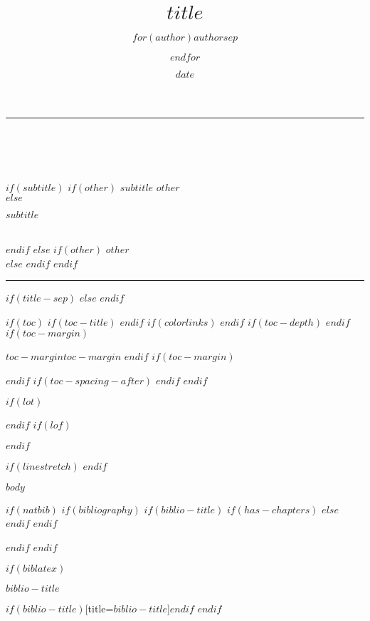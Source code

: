 \documentclass[
  $if(fontsize)$
    $fontsize$,
  $endif$
  $if(lang)$
    $babel-lang$,
  $endif$
  $if(papersize)$
    $papersize$paper,
  $endif$
  $if(beamer)$
    ignorenonframetext,
  $if(handout)$
    handout,
  $endif$
  $if(aspectratio)$
    aspectratio=$aspectratio$,
  $endif$
  $endif$
  $for(classoption)$
    $classoption$$sep$,
  $endfor$
]{$if(documentclass)$$documentclass$$else$article$endif$}
\title{$title$}
\author{$for(author)$$author$$sep$ \and $endfor$}
\date{$date$}
\makeatletter
\renewcommand{\maketitle}{%
    \noindent\rule{\textwidth}{1.5pt}\\[7pt]
    {\large \@author \hfill \@date} \\[0.75\baselineskip]
    {\LARGE\centerline{\textbf{\@title}}} \\[0.75\baselineskip]
    $if(subtitle)$
      $if(other)$
        {\normalsize $subtitle$ \hfill $other$} \\
      $else$
        {\normalsize \centerline{$subtitle$}} \\
      $endif$
    $else$
      $if(other)$
        {\normalsize \null\hfill $other$} \\
      $else$
      $endif$
    $endif$
    \rule{\textwidth}{1.5pt}
}
\makeatother
\begin{document}
\maketitle

$if(title-sep)$
  \vspace{$title-sep$}
$else$
  \vspace{2em}
$endif$

$if(toc)$
  $if(toc-title)$
    \renewcommand*\contentsname{
      $if(toc-title-spacing)$
        \vspace{$toc-title-spacing$}
      $endif$
      $toc-title$
      $if(toc-title-spacing)$
        \vspace{$toc-title-spacing$}
      $endif$
    }
  $endif$
  $if(colorlinks)$
    \hypersetup{linktoc=page}
  $endif$
  $if(toc-depth)$
    \setcounter{tocdepth}{$toc-depth$}
  $endif$
  $if(toc-margin)$
    \begin{adjustwidth}{$toc-margin$}{$toc-margin$}
  $endif$
  \tableofcontents
  $if(toc-margin)$
    \end{adjustwidth}
  $endif$
  $if(toc-spacing-after)$
    \vspace{$toc-spacing-after$}
  $endif$
$endif$

$if(lot)$
  \listoftables
$endif$
$if(lof)$
  \listoffigures
$endif$

$if(linestretch)$
$endif$

$body$

$if(natbib)$
  $if(bibliography)$
    $if(biblio-title)$
      $if(has-chapters)$
        \renewcommand\bibname{$biblio-title$}
      $else$
        \renewcommand\refname{$biblio-title$}
      $endif$
    $endif$
    \newpage
    
  $endif$
$endif$

$if(biblatex)$
  \begin{frame}[allowframebreaks]{$biblio-title$}
    \bibliographytrue
    \printbibliography[heading=none]
  \end{frame}
  \printbibliography$if(biblio-title)$[title=$biblio-title$]$endif$
$endif$
\end{document}
